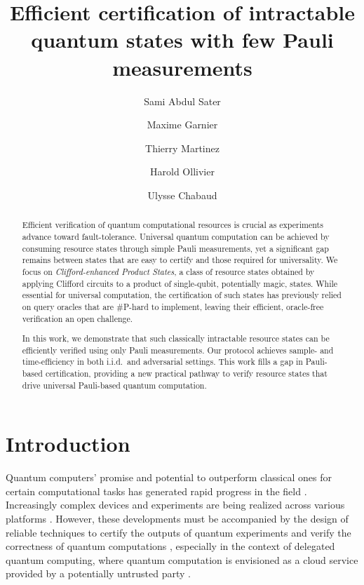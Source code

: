 \documentclass[a4paper,twocolumn,11pt,unpublished]{../../revision/quantumarticle}
\title{Efficient certification of intractable quantum states with few Pauli measurements}
\author{Sami Abdul Sater}
\author{Maxime Garnier}
\author{Thierry Martinez}
\author{Harold Ollivier}
\author{Ulysse Chabaud}
\affiliation{INRIA, DIENS, Ecole Normale Supérieure, PSL University, CNRS, 45 rue d’Ulm, Paris 75005, France}
\begin{document}
\begin{abstract}
Efficient verification of quantum computational resources is crucial as experiments advance toward fault-tolerance. Universal quantum computation can be achieved by consuming resource states through simple Pauli measurements, yet a significant gap remains between states that are easy to certify and those required for universality. We focus on \emph{Clifford-enhanced Product States}, a class of resource states obtained by applying Clifford circuits to a product of single-qubit, potentially magic, states. While essential for universal computation, the certification of such states has previously relied on query oracles that are \#P-hard to implement, leaving their efficient, oracle-free verification an open challenge.

In this work, we demonstrate that such classically intractable resource states can be efficiently verified using only Pauli measurements. 
Our protocol achieves sample- and time-efficiency in both i.i.d.\ and adversarial settings.
This work fills a gap in Pauli-based certification, providing a new practical pathway to verify resource states that drive universal Pauli-based quantum computation.
\end{abstract}


\maketitle


\section{Introduction}

Quantum computers' promise and potential to outperform classical ones for certain computational tasks
\cite{S94algorithms, G96fast, F82simulating, F86quantum, D85quantum, HCMP25vast}
has generated rapid progress in the field \cite{P18quantum, EP25mind}.
Increasingly complex devices and experiments are being realized across various platforms
\cite{NLDC22beating, AAAA25constructive, DBMA25breaking}.
However, these developments must be accompanied by the design of reliable techniques to
{certify the outputs of quantum experiments} and {verify the correctness of quantum computations}
\cite{EHWR20quantum, BPY25quantum, PYBB24benchmarking}, especially in the context of delegated quantum computing,
where quantum computation is envisioned as a cloud service provided by a potentially untrusted party
\cite{GKK19verification}.
\end{document}
